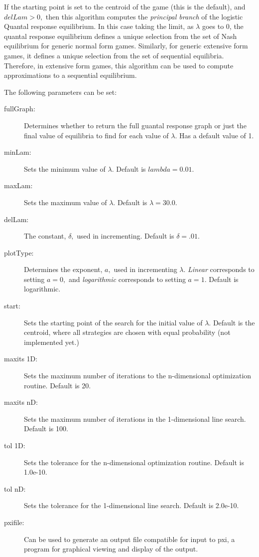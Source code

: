 If the starting point is set to the centroid of the game (this is the
default), and $delLam > 0,$ then this algorithm computes the {\em principal
branch} of the logistic Quantal response equilibrium.  In this case
taking the limit, as $\lambda$ goes to 0, the quantal response equilibrium
defines a unique selection from the set of Nash equilibrium for generic
normal form games.  Similarly, for generic extensive form games, it
defines a unique selection from the set of sequential equilibria.
Therefore, in extensive form games, this algorithm can be used to compute
approximations to a sequential equilibrium.

The following parameters can be set:

\begin{description}
\item[fullGraph:] Determines whether to return the full guantal response 
graph or just the final value  of equilibria to find for each value of
$\lambda$.  Has a default value of 1.

\item[minLam:] Sets the minimum value of $\lambda.$
Default is $lambda = 0.01$.

\item[maxLam:] Sets the maximum value of $\lambda.$  Default is
$\lambda = 30.0.$

\item[delLam:]  The constant, $\delta,$ used in incrementing.   Default is
$\delta = .01.$

\item[plotType:] Determines the exponent, $a,$ used in incrementing
$\lambda.$  {\em Linear} corresponds to setting $a = 0,$ and {\em
logarithmic} corresponds to setting $a = 1.$ Default is logarithmic.

\item[start:] Sets the starting point of the search for the initial value of
$\lambda.$  Default is the centroid, where all strategies are chosen
with equal probability (not implemented yet.)

\item[maxits 1D:] Sets the maximum number of iterations to the
n-dimensional optimization routine.  Default is 20.

\item[maxits nD:] Sets the maximum number of iterations in the
1-dimensional line search.  Default is 100.

\item[tol 1D:] Sets the tolerance for the n-dimensional optimization
routine.  Default is 1.0e-10.

\item[tol nD:] Sets the tolerance for the 1-dimensional line search.
Default is 2.0e-10.

\item[pxifile:] Can be used to generate an output file compatible for
input to pxi, a program for graphical viewing and display of the output.
\end{description}

